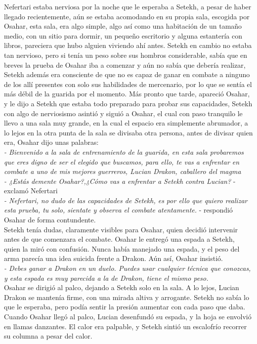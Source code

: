 Nefertari estaba nerviosa por la noche que le esperaba a Setekh, a pesar de haber llegado recientemente, aún se estaba acomodando en su propia sala,
escogida por Osahar, esta sala, era algo simple, algo así como una habitación de un tamaño medio, con un sitio para dormir, un pequeño escritorio y alguna estantería con libros, pareciera que hubo alguien viviendo ahí antes.
Setekh en cambio no estaba tan nervioso, pero si tenía un peso sobre sus hombros considerable, sabía que en breves la prueba de Osahar iba a comenzar y aún no sabía que debería realizar, Setekh además era consciente de que no es capaz de
ganar en combate a ninguno de los allí presentes con solo sus habilidades de mercenario, por lo que se sentía el más débil de la guarida por el momento. Más pronto que tarde, apareció Osahar, y le dijo a Setekh que estaba todo preparado para probar
sus capacidades, Setekh con algo de nerviosismo asintió y siguió a Osahar, el cual con paso tranquilo le llevo a una sala muy grande, en la cual el espacio era simplemente abrumador, a lo lejos en la otra punta de la sala se divisaba otra persona, antes de divisar quien era, Osahar dijo unas palabras:\\
\textit{- Bienvenido a la sala de entrenamiento de la guarida, en esta sala probaremos que eres digno de ser el elegido que buscamos, para ello, te vas a enfrentar en combate a uno de mis mejores guerreros, Lucian Drakon, caballero del magma}\\
\textit{- ¿Estás demente Osahar?,¿Cómo vas a enfrentar a Setekh contra Lucian?} - exclamó Nefertari\\
\textit{- Nefertari, no dudo de las capacidades de Setekh, es por ello que quiero realizar esta prueba, tu solo, sientate y observa el combate atentamente.} - respondió Osahar de forma contundente.\\
Setekh tenía dudas, claramente visibles para Osahar, quien decidió intervenir antes de que comenzara el combate. Osahar le entregó una espada a Setekh, quien la miró con confusión. Nunca había manejado una espada, y el peso del arma parecía una idea suicida frente a Drakon. Aún así, Osahar insistió.\\
\textit{- Debes ganar a Drakon en un duelo. Puedes usar cualquier técnica que conozcas, y esta espada es muy parecida a la de Drakon, tiene el mismo peso.}\\
Osahar se dirigió al palco, dejando a Setekh solo en la sala. A lo lejos, Lucian Drakon se mantenía firme, con una mirada altiva y arrogante. Setekh no sabía lo que le esperaba, pero podía sentir la presión aumentar con cada paso que daba. Cuando Osahar llegó al palco, Lucian desenfundó su espada, y la hoja se envolvió en llamas danzantes. El calor era palpable, y Setekh sintió un escalofrío recorrer su columna a pesar del calor.\\
